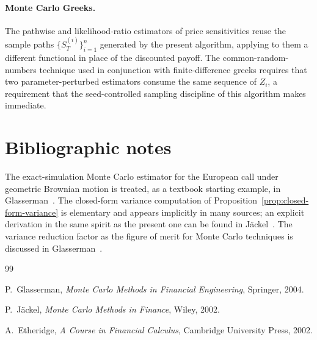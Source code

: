 \documentclass[11pt,a4paper]{article}
\theoremstyle{plain}
\theoremstyle{definition}
\theoremstyle{remark}
\begin{document}
\paragraph{Monte Carlo Greeks.} The pathwise and likelihood-ratio
estimators of price sensitivities reuse the sample paths
$\{S_T^{(i)}\}_{i=1}^n$ generated by the present algorithm, applying
to them a different functional in place of the discounted payoff. The
common-random-numbers technique used in conjunction with
finite-difference greeks requires that two parameter-perturbed
estimators consume the same sequence of $Z_i$, a requirement that the
seed-controlled sampling discipline of this algorithm makes immediate.

\section{Bibliographic notes}
\label{sec:biblio}

The exact-simulation Monte Carlo estimator for the European call under
geometric Brownian motion is treated, as a textbook starting example,
in Glasserman~\cite[Section~1.1.2 and Section~3.2]{Glasserman}. The
closed-form variance computation of
Proposition~\ref{prop:closed-form-variance} is elementary and appears
implicitly in many sources; an explicit derivation in the same spirit
as the present one can be found in Jäckel~\cite{Jackel}.
The variance reduction factor as the figure of merit for Monte Carlo
techniques is discussed in
Glasserman~\cite[Section~4.1]{Glasserman}.

\begin{thebibliography}{99}

P.\ Glasserman,
\emph{Monte Carlo Methods in Financial Engineering},
Springer, 2004.

P.\ J\"ackel,
\emph{Monte Carlo Methods in Finance},
Wiley, 2002.

A.\ Etheridge,
\emph{A Course in Financial Calculus},
Cambridge University Press, 2002.

\end{thebibliography}
\end{document}
